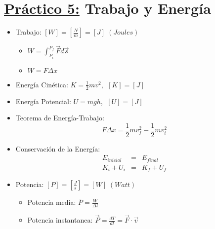 \documentclass[12pt,a4paper]{article}
\begin{document}
	\section*{\underline{Práctico 5:} Trabajo y Energía}
		\begin{multicols}{2}
			\begin{itemize}
				\item Trabajo: $[W] = [\frac{N}{m}] = [J] \; (Joules)$
					\begin{itemize}
						\item $W = \int_{P_{i}}^{P_{f}} \vec{F} d\vec{s}$
						\item $W = F \Delta x$
					\end{itemize}
				\item Energía Cinética: $K = \frac{1}{2} m v^{2}$, $\; [K] = [J]$
				\item Energía Potencial: $U = mgh$, $\; [U] = [J]$
				\item Teorema de Energía-Trabajo:
					\[
						F \Delta x = \frac{1}{2} m v_{f}^{2} - \frac{1}{2} m v_{i}^{2}
					\]
				\item Conservación de la Energía:
					\begin{eqnarray*}
						E_{inicial} &=& E_{final} \\
						K_{i} + U_{i} &=& K_{f} + U_{f}
					\end{eqnarray*}

				\item Potencia: $[P] = [\frac{J}{s}] = [W] \; (Watt)$
					\begin{itemize}
						\item Potencia media: $\overline{P} = \frac{W}{\Delta t}$
						\item Potencia instantanea: $\vec{P} = \frac{dT}{dt} = \vec{F} \cdot \vec{v}$
					\end{itemize}
			\end{itemize}
		\end{multicols}
\end{document}
